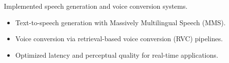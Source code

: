 Implemented speech generation and voice conversion systems.
\begin{itemize}
\item Text-to-speech generation with Massively Multilingual Speech (MMS).
\item Voice conversion via retrieval-based voice conversion (RVC) pipelines.
\item Optimized latency and perceptual quality for real-time applications.
\end{itemize}
{\LaTeXraggedright
{}
\par}